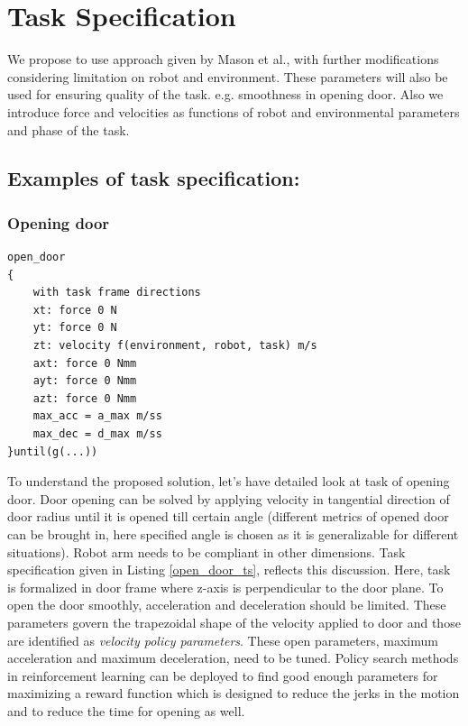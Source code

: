 \documentclass[thesis]{mas_proposal}
\begin{document}
\section{Task Specification}
We propose to use approach given by Mason et al.\cite{mason1981compliance}, with further modifications considering limitation on robot and environment. These parameters will also be used for ensuring quality of the task. e.g. smoothness in opening door. Also we introduce force and velocities as functions of robot and environmental parameters and phase of the task. 

\subsection{Examples of task specification:} 
\subsubsection{Opening door}

\begin{lstlisting}[label=open_door_ts,caption=Task specification for opening door]
open_door
{
	with task frame directions
	xt: force 0 N
	yt: force 0 N
	zt: velocity f(environment, robot, task) m/s
	axt: force 0 Nmm
	ayt: force 0 Nmm
	azt: force 0 Nmm
	max_acc = a_max m/ss
	max_dec = d_max m/ss
}until(g(...))

\end{lstlisting}
To understand the proposed solution, let's have detailed look at task of opening door. Door opening can be solved by applying velocity in tangential direction of door radius until it is opened till certain angle (different metrics of opened door can be brought in, here specified angle is chosen as it is generalizable for different situations). Robot arm needs to be compliant in other dimensions. Task specification given in Listing \ref{open_door_ts}, reflects this discussion. Here, task is formalized in door frame where z-axis is perpendicular to the door plane. To open the door smoothly, acceleration and deceleration should be limited. These parameters govern the trapezoidal shape of the velocity applied to door and those are identified as \textit{velocity policy parameters}. These open parameters, maximum acceleration and maximum deceleration, need to be tuned. Policy search methods in reinforcement learning can be deployed to find good enough parameters for maximizing a reward function which is designed to reduce the jerks in the motion and to reduce the time for opening as well.
\end{document}
